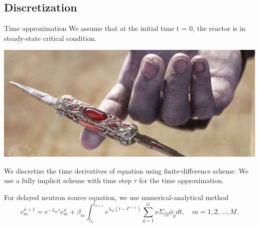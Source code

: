 \documentclass[10pt,pdf,hyperref={unicode}]{beamer}
\begin{document}
\subsection{Discretization}
	\begin{frame}{Time approximation}
		We assume that at the initial time t = 0, the reactor is in steady-state critical condition.
		
		\begin{center}
			\includegraphics[width=0.5\linewidth] {balance.jpg}
		\end{center}
		
		We discretize the time derivatives of equation using finite-difference scheme. 
		We use a fully implicit scheme with time step $\tau$ for the time approximation.

		For delayed neutron source equation, we use numerical-analytical method
		\[
			c_m^{n+1} = e^{-\lambda_m\tau} c_m^n + 
			\beta_m \int_{t_n}^{t_{n+1}} e^{\lambda_m (t - t^{n+1})} \sum_{g=1}^{G} \nu \Sigma_{fg} \phi_g d t,
			\quad m = 1,2,\dots,M.
		\]
	\end{frame}
\end{document}
